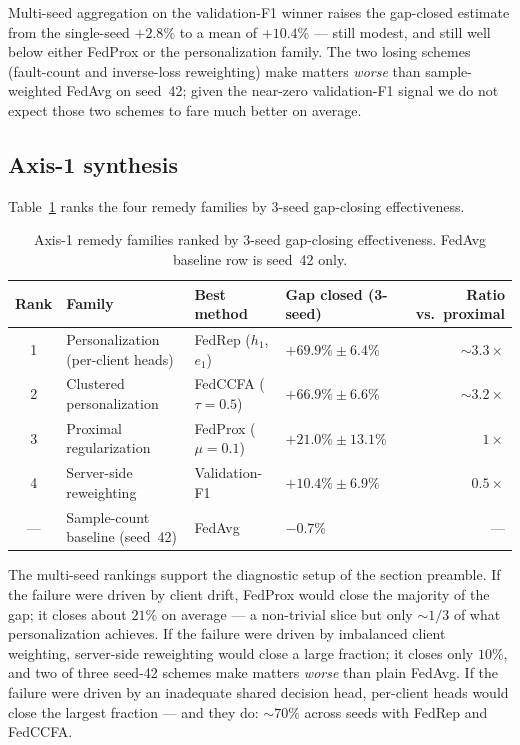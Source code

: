\documentclass[preprint,12pt,authoryear]{elsarticle}
\begin{document}
Multi-seed aggregation on the validation-F1 winner raises the
gap-closed estimate from the single-seed $+2.8\%$ to a mean of
$+10.4\%$ --- still modest, and still well below either FedProx or
the personalization family. The two losing schemes (fault-count and
inverse-loss reweighting) make matters \emph{worse} than
sample-weighted FedAvg on seed~42; given the near-zero validation-F1
signal we do not expect those two schemes to fare much better on
average.

\subsection{Axis-1 synthesis}
\label{sec:axis1-results-synth}

Table~\ref{tab:axis1-synth} ranks the four remedy families by 3-seed
gap-closing effectiveness.

\begin{table}[!ht]
\centering
\small
\caption{Axis-1 remedy families ranked by 3-seed gap-closing
effectiveness. FedAvg baseline row is seed~42 only.}
\label{tab:axis1-synth}
\begin{tabular}{clllr}
\toprule
Rank & Family & Best method & Gap closed (3-seed) & Ratio vs.\ proximal \\
\midrule
1 & Personalization (per-client heads) & FedRep ($h_1$, $e_1$) & \textbf{$+69.9\% \pm 6.4\%$} & \textbf{$\sim 3.3\times$} \\
2 & Clustered personalization & FedCCFA ($\tau = 0.5$) & $+66.9\% \pm 6.6\%$ & $\sim 3.2\times$ \\
3 & Proximal regularization & FedProx ($\mu = 0.1$) & $+21.0\% \pm 13.1\%$ & $1\times$ \\
4 & Server-side reweighting & Validation-F1 & $+10.4\% \pm 6.9\%$ & $0.5\times$ \\
--- & Sample-count baseline (seed~42) & FedAvg & $-0.7\%$ & --- \\
\bottomrule
\end{tabular}
\end{table}

The multi-seed rankings support the diagnostic setup of the section
preamble. If the failure were driven by client drift, FedProx would
close the majority of the gap; it closes about $21\%$ on average --- a
non-trivial slice but only $\sim 1/3$ of what personalization achieves.
If the failure were driven by imbalanced client weighting, server-side
reweighting would close a large fraction; it closes only $10\%$, and
two of three seed-42 schemes make matters \emph{worse} than plain
FedAvg. If the failure were driven by an inadequate shared decision
head, per-client heads would close the largest fraction --- and they
do: $\sim 70\%$ across seeds with FedRep and FedCCFA.
\end{document}
